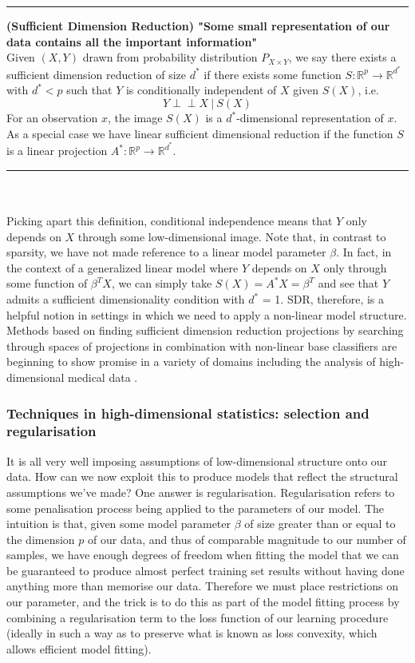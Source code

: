 \documentclass[thesis.tex]{subfiles}
\begin{document}
\hrule
\begin{definition}{\textbf{(Sufficient Dimension Reduction) "Some small representation of our data contains all the important information"}} \\
Given $(X,Y)$ drawn from probability distribution $P_{X\times Y}$, we say there exists a sufficient dimension reduction of size $d^*$ if there exists some function $S: \mathbb{R}^p \rightarrow \mathbb{R}^{d^*}$  with $d^* < p$ such that $Y$ is conditionally independent of $X$ given $S(X)$, i.e.
$$ Y \perp\!\!\!\perp X \ | \ S(X) $$
For an observation $x$, the image $S(X)$ is a $d^*$-dimensional representation of $x$. As a special case we have linear sufficient dimensional reduction if the function $S$ is a linear projection $A^*:\mathbb{R}^p\rightarrow \mathbb{R}^{d^*}$.
\end{definition}
\hrule
~\\~\\
Picking apart this definition, conditional independence means that $Y$ only depends on $X$ through some low-dimensional image. Note that, in contrast to sparsity, we have not made reference to a linear model parameter $\beta$. In fact, in the context of a generalized linear model where $Y$ depends on $X$ only through some function of $\beta^TX$, we can simply take $S(X) = A^*X = \beta^T$ and see that $Y$ admits a sufficient dimensionality condition with $d^*$ = 1. SDR, therefore, is a helpful notion in settings in which we need to apply a non-linear model structure. Methods based on finding sufficient dimension reduction projections by searching through spaces of projections \citep{omidiran_high-dimensional_2010} in combination with non-linear base classifiers are beginning to show promise in a variety of domains  including the analysis of high-dimensional medical data \citep{cannings_random-projection_2017}.


\subsubsection{Techniques in high-dimensional statistics: selection and regularisation}
It is all very well imposing assumptions of low-dimensional structure onto our data. How can we now exploit this to produce models that reflect the structural assumptions we've made? One answer is regularisation. Regularisation refers to some penalisation process being applied to the parameters of our model. The intuition is that, given some model parameter $\beta$ of size greater than or equal to the dimension $p$ of our data, and thus of comparable magnitude to our number of samples, we have enough degrees of freedom when fitting the model that we can be guaranteed to produce almost perfect training set results without having done anything more than memorise our data. Therefore we must place restrictions on our parameter, and the trick is to do this as part of the model fitting process by combining a regularisation term to the loss function of our learning procedure (ideally in such a way as to preserve what is known as loss convexity, which allows efficient model fitting).
\end{document}
